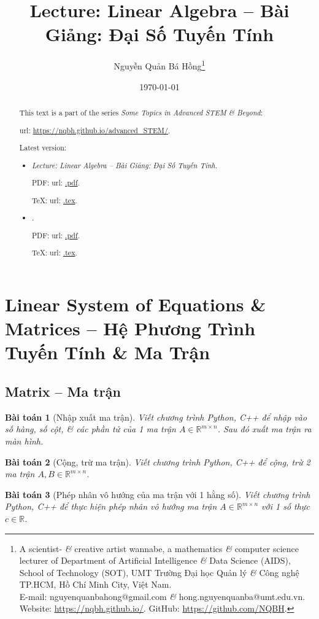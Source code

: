 \documentclass{article}
\title{Lecture: Linear Algebra -- Bài Giảng: Đại Số Tuyến Tính}
\author{Nguyễn Quản Bá Hồng\footnote{A scientist- {\it\&} creative artist wannabe, a mathematics {\it\&} computer science lecturer of Department of Artificial Intelligence {\it\&} Data Science (AIDS), School of Technology (SOT), UMT Trường Đại học Quản lý {\it\&} Công nghệ TP.HCM, Hồ Chí Minh City, Việt Nam.\\E-mail: {\sf nguyenquanbahong@gmail.com} {\it\&} {\sf hong.nguyenquanba@umt.edu.vn}. Website: \url{https://nqbh.github.io/}. GitHub: \url{https://github.com/NQBH}.}}
\date{\today}
\newtheorem{baitoan}{Bài toán}
\begin{document}
\maketitle
\begin{abstract}
    This text is a part of the series {\it Some Topics in Advanced STEM \& Beyond}:

    {\sc url}: \url{https://nqbh.github.io/advanced_STEM/}.

    Latest version:
    \begin{itemize}
        \item {\it Lecture: Linear Algebra -- Bài Giảng: Đại Số Tuyến Tính}.

        PDF: {\sc url}: \url{.pdf}.

        \TeX: {\sc url}: \url{.tex}.
        \item {\it }.

        PDF: {\sc url}: \url{.pdf}.

        \TeX: {\sc url}: \url{.tex}.
    \end{itemize}
\end{abstract}
\tableofcontents


\section{Linear System of Equations \& Matrices -- Hệ Phương Trình Tuyến Tính \& Ma Trận}


\subsection{Matrix -- Ma trận}

\begin{baitoan}[Nhập xuất ma trận]
    Viết chương trình {\sf Python, C++} để nhập vào số hàng, số cột, \& các phần tử của 1 ma trận $A\in\mathbb{R}^{m\times n}$. Sau đó xuất ma trận ra màn hình.
\end{baitoan}

\begin{baitoan}[Cộng, trừ ma trận]
    Viết chương trình {\sf Python, C++} để cộng, trừ 2 ma trận $A,B\in\mathbb{R}^{m\times n}$.
\end{baitoan}

\begin{baitoan}[Phép nhân vô hướng của ma trận với 1 hằng số]
    Viết chương trình {\sf Python, C++} để thực hiện phép nhân vô hướng ma trận $A\in\mathbb{R}^{m\times n}$ với 1 số thực $c\in\mathbb{R}$.
\end{baitoan}
\end{document}

